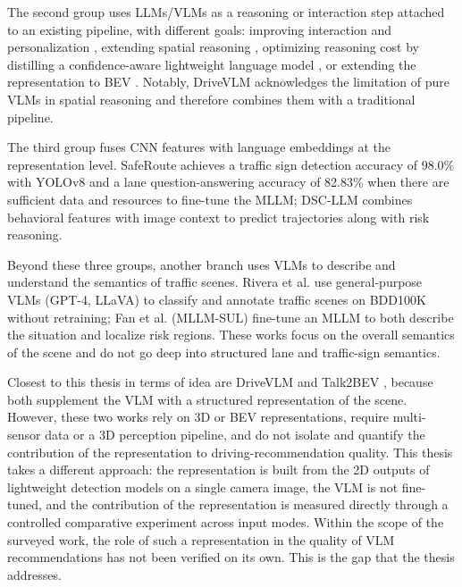\documentclass[12pt,a4paper]{report}
\begin{document}
The second group uses LLMs/VLMs as a reasoning or interaction step attached to an existing pipeline, with different goals: improving interaction and personalization \cite{cui2024driveasyouspeak}, extending spatial reasoning \cite{tian2024drivevlm}, optimizing reasoning cost by distilling a confidence-aware lightweight language model \cite{yao2026confidenceaware}, or extending the representation to BEV \cite{choudhary2024talk2bev}. Notably, DriveVLM \cite{tian2024drivevlm} acknowledges the limitation of pure VLMs in spatial reasoning and therefore combines them with a traditional pipeline.

The third group fuses CNN features with language embeddings at the representation level. SafeRoute \cite{shaw2025saferoute} achieves a traffic sign detection accuracy of 98.0\% with YOLOv8 and a lane question-answering accuracy of 82.83\% when there are sufficient data and resources to fine-tune the MLLM; DSC-LLM \cite{kim2025dscllm} combines behavioral features with image context to predict trajectories along with risk reasoning.

Beyond these three groups, another branch uses VLMs to describe and understand the semantics of traffic scenes. Rivera et al. \cite{rivera2025scenario} use general-purpose VLMs (GPT-4, LLaVA) to classify and annotate traffic scenes on BDD100K without retraining; Fan et al. \cite{fan2024mllmsul} (MLLM-SUL) fine-tune an MLLM to both describe the situation and localize risk regions. These works focus on the overall semantics of the scene and do not go deep into structured lane and traffic-sign semantics.

Closest to this thesis in terms of idea are DriveVLM \cite{tian2024drivevlm} and Talk2BEV \cite{choudhary2024talk2bev}, because both supplement the VLM with a structured representation of the scene. However, these two works rely on 3D or BEV representations, require multi-sensor data or a 3D perception pipeline, and do not isolate and quantify the contribution of the representation to driving-recommendation quality. This thesis takes a different approach: the representation is built from the 2D outputs of lightweight detection models on a single camera image, the VLM is not fine-tuned, and the contribution of the representation is measured directly through a controlled comparative experiment across input modes. Within the scope of the surveyed work, the role of such a representation in the quality of VLM recommendations has not been verified on its own. This is the gap that the thesis addresses.
\end{document}
